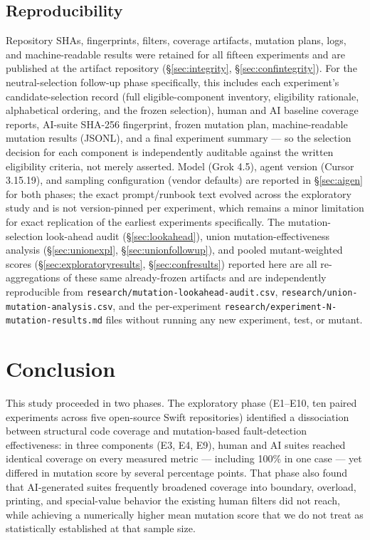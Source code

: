 \documentclass[10pt,conference]{IEEEtran}
\begin{document}
\subsection{Reproducibility}
Repository SHAs, fingerprints, filters, coverage artifacts, mutation plans, logs, and machine-readable results were retained for all fifteen experiments and are published at the artifact repository (\S\ref{sec:integrity}, \S\ref{sec:confintegrity}). For the neutral-selection follow-up phase specifically, this includes each experiment's candidate-selection record (full eligible-component inventory, eligibility rationale, alphabetical ordering, and the frozen selection), human and AI baseline coverage reports, AI-suite SHA-256 fingerprint, frozen mutation plan, machine-readable mutation results (JSONL), and a final experiment summary — so the selection decision for each component is independently auditable against the written eligibility criteria, not merely asserted. Model (Grok 4.5), agent version (Cursor 3.15.19), and sampling configuration (vendor defaults) are reported in \S\ref{sec:aigen} for both phases; the exact prompt/runbook text evolved across the exploratory study and is not version-pinned per experiment, which remains a minor limitation for exact replication of the earliest experiments specifically. The mutation-selection look-ahead audit (\S\ref{sec:lookahead}), union mutation-effectiveness analysis (\S\ref{sec:unionexpl}, \S\ref{sec:unionfollowup}), and pooled mutant-weighted scores (\S\ref{sec:exploratoryresults}, \S\ref{sec:confresults}) reported here are all re-aggregations of these same already-frozen artifacts and are independently reproducible from \texttt{research/mutation-lookahead-audit.csv}, \texttt{research/union-mutation-analysis.csv}, and the per-experiment \texttt{research/experiment-N-mutation-results.md} files without running any new experiment, test, or mutant.

\section{Conclusion}
\label{sec:conclusion}
This study proceeded in two phases. The exploratory phase (E1--E10, ten paired experiments across five open-source Swift repositories) identified a dissociation between structural code coverage and mutation-based fault-detection effectiveness: in three components (E3, E4, E9), human and AI suites reached identical coverage on every measured metric — including 100\% in one case — yet differed in mutation score by several percentage points. That phase also found that AI-generated suites frequently broadened coverage into boundary, overload, printing, and special-value behavior the existing human filters did not reach, while achieving a numerically higher mean mutation score that we do not treat as statistically established at that sample size.
\end{document}
